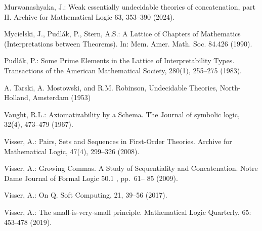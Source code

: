 \documentclass[10pt,a4paper, openany,  oldfontcommands]{memoir}
\newtheorem{open problem} [theorem] {Open Problem}
\newtheorem{open question} [theorem] {Open Question}
\begin{document}
\begin{thebibliography}{}
Murwanashyaka, J.: Weak essentially undecidable theories of concatenation, part II. Archive for  Mathematical Logic 63, 353–390 (2024). 





Mycielski, J.,  Pudlák, P.,     Stern, A.S.: A Lattice of Chapters of Mathematics (Interpretations between Theorems). 
In: Mem. Amer. Math. Soc. 84.426 (1990).






Pudlák, P.: Some Prime Elements in the Lattice of Interpretability Types.
 Transactions of the American Mathematical Society,  280(1),   255–275   (1983).










A. Tarski,   A.  Mostowski,  and    R.M.   Robinson,   Undecidable Theories, 
North-Holland, Amsterdam (1953)






Vaught, R.L.: Axiomatizability by a Schema. The Journal of symbolic logic,   32(4),    473–479  (1967).







Visser, A.: Pairs, Sets and Sequences in First-Order Theories. Archive for Mathematical Logic,    47(4),      299–326  (2008). 




Visser, A.:  Growing Commas. A Study of Sequentiality and Concatenation.  Notre Dame Journal of  Formal Logic 50.1 , pp.~61– 85  (2009). 


Visser, A.: On Q.  Soft Computing,  21, 39–56 (2017).


Visser, A.: The small-is-very-small principle.  Mathematical  Logic Quarterly, 65: 453-478   (2019).  %




\end{thebibliography}
\end{document}
